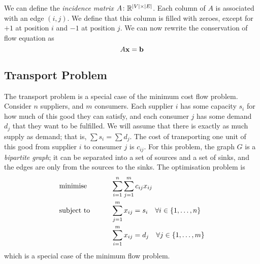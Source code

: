\begin{definition}
    We can define the \textit{incidence matrix} \( A \colon \mathbb R^{\abs{V} \times \abs{E}} \).
    Each column of \( A \) is associated with an edge \( (i,j) \).
    We define that this column is filled with zeroes, except for \( +1 \) at position \( i \) and \( -1 \) at position \( j \).
    We can now rewrite the conservation of flow equation as
    \[ A\vb x = \vb b \]
\end{definition}

\subsection{Transport Problem}
The transport problem is a special case of the minimum cost flow problem.
Consider \( n \) suppliers, and \( m \) consumers.
Each supplier \( i \) has some capacity \( s_i \) for how much of this good they can satisfy,
and each consumer \( j \) has some demand \( d_j \) that they want to be fulfilled.
We will assume that there is exactly as much supply as demand; that is, \( \sum s_i = \sum d_j \).
The cost of transporting one unit of this good from supplier \( i \) to consumer \( j \) is \( c_{ij} \).
For this problem, the graph \( G \) is a \textit{bipartite graph}; it can be separated into a set of sources and a set of sinks, and the edges are only from the sources to the sinks.
The optimisation problem is
\begin{alignat*}{2}
    & \text{minimise} & \qquad & \sum_{i = 1}^n \sum_{j = 1}^m c_{ij}x_{ij}            \\
    & \text{subject to}                                &        & \sum_{j = 1}^m x_{ij} = s_i \quad \forall i \in \qty{1,\dots,n} \\
    & & & \sum_{i = 1}^m x_{ij} = d_j \quad \forall j \in \qty{1,\dots,m} \\
\end{alignat*}
which is a special case of the minimum flow problem.

